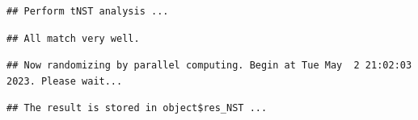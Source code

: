 \documentclass[
]{book}
\newenvironment{Shaded}{\begin{snugshade}}{\end{snugshade}}
\newcommand{\AttributeTok}[1]{\textcolor[rgb]{0.77,0.63,0.00}{#1}}
\newcommand{\CommentTok}[1]{\textcolor[rgb]{0.56,0.35,0.01}{\textit{#1}}}
\newcommand{\ConstantTok}[1]{\textcolor[rgb]{0.00,0.00,0.00}{#1}}
\newcommand{\FunctionTok}[1]{\textcolor[rgb]{0.00,0.00,0.00}{#1}}
\newcommand{\NormalTok}[1]{#1}
\newcommand{\SpecialCharTok}[1]{\textcolor[rgb]{0.00,0.00,0.00}{#1}}
\newcommand{\StringTok}[1]{\textcolor[rgb]{0.31,0.60,0.02}{#1}}
\begin{document}
\begin{Shaded}
\end{Shaded}

\begin{verbatim}
## Perform tNST analysis ...
\end{verbatim}

\begin{verbatim}
## All match very well.
\end{verbatim}

\begin{verbatim}
## Now randomizing by parallel computing. Begin at Tue May  2 21:02:03 2023. Please wait...
\end{verbatim}

\begin{verbatim}
## The result is stored in object$res_NST ...
\end{verbatim}
\end{document}
